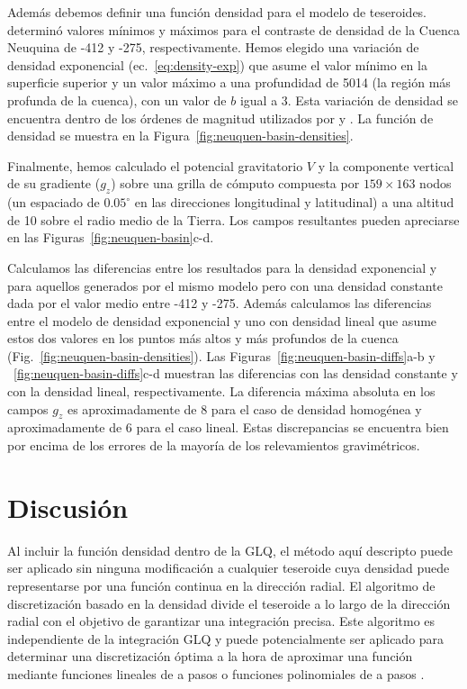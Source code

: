 Además debemos definir una función densidad para el modelo de teseroides.
\citet{sigismondi2012} determinó valores mínimos y máximos para el contraste de
densidad de la Cuenca Neuquina de -412\kgpercubicm{} y -275\kgpercubicm{},
respectivamente.
Hemos elegido una variación de densidad exponencial (ec.~\ref{eq:density-exp})
que asume el valor mínimo en la superficie superior y un valor máximo a una
profundidad de 5014\m{} (la región más profunda de la cuenca), con un valor de
$b$ igual a 3.
Esta variación de densidad se encuentra dentro de los órdenes de magnitud
utilizados por \citet{cowie1990} y \citet{cordell1973}.
La función de densidad se muestra en la
Figura~\ref{fig:neuquen-basin-densities}.

Finalmente, hemos calculado el potencial gravitatorio $V$ y la componente
vertical de su gradiente ($g_z$) sobre una grilla de cómputo compuesta por
$159\times163$ nodos (un espaciado de $0.05^\circ$ en las direcciones
longitudinal y latitudinal) a una altitud de 10\km{} sobre el radio medio de la
Tierra.
Los campos resultantes pueden apreciarse en las
Figuras~\ref{fig:neuquen-basin}c-d.

Calculamos las diferencias entre los resultados para la densidad exponencial
y para aquellos generados por el mismo modelo pero con una densidad constante
dada por el valor medio entre -412\kgpercubicm{} y -275\kgpercubicm{}.
Además calculamos las diferencias entre el modelo de densidad exponencial y uno
con densidad lineal que asume estos dos valores en los puntos más altos y más
profundos de la cuenca (Fig.~\ref{fig:neuquen-basin-densities}).
Las Figuras~\ref{fig:neuquen-basin-diffs}a-b
y ~\ref{fig:neuquen-basin-diffs}c-d muestran las diferencias con las densidad
constante y con la densidad lineal, respectivamente.
La diferencia máxima absoluta en los campos $g_z$ es aproximadamente de
8\mGal{} para el caso de densidad homogénea y aproximadamente de 6\mGal{} para
el caso lineal.
Estas discrepancias se encuentra bien por encima de los errores de la mayoría
de los relevamientos gravimétricos.



\section{Discusión}

Al incluir la función densidad dentro de la \ac{GLQ}, el método aquí descripto
puede ser aplicado sin ninguna modificación a cualquier teseroide cuya
densidad puede representarse por una función continua en la dirección radial.
El algoritmo de discretización basado en la densidad divide el teseroide a lo
largo de la dirección radial con el objetivo de garantizar una integración
precisa.
Este algoritmo es independiente de la integración \ac{GLQ} y puede
potencialmente ser aplicado para determinar una discretización óptima a la hora
de aproximar una función mediante funciones lineales de a pasos \citep{lin2019}
o funciones polinomiales de a pasos \citep{fukushima2018}.

